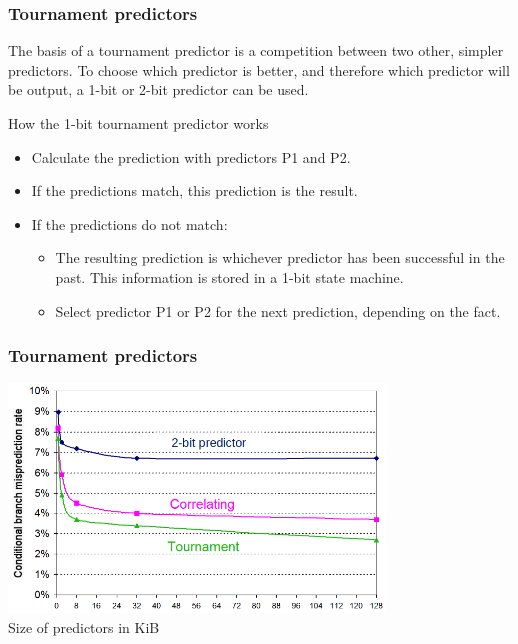 \documentclass{beamer}
\begin{document}
\begin{frame}
\frametitle{Tournament predictors}

The basis of a tournament predictor is a competition between two other, simpler predictors. To choose which predictor is better, and therefore which predictor will be output, a 1-bit or 2-bit predictor can be used.

\bigskip
How the 1-bit tournament predictor works
\begin{itemize}
\item Calculate the prediction with predictors P1 and P2.
\item If the predictions match, this prediction is the result.
\item If the predictions do not match:
\begin{itemize}
\item The resulting prediction is whichever predictor has been successful in the past. This information is stored in a 1-bit state machine.
\item Select predictor P1 or P2 for the next prediction, depending on the fact.
\end{itemize}
\end{itemize}
\end{frame}

\begin{frame}
\frametitle{Tournament predictors}

\begin{center}
\includegraphics[width=0.75\textwidth]{fig/tournament.png}\\
\small Size of predictors in KiB
\end{center}
\end{frame}
\end{document}
